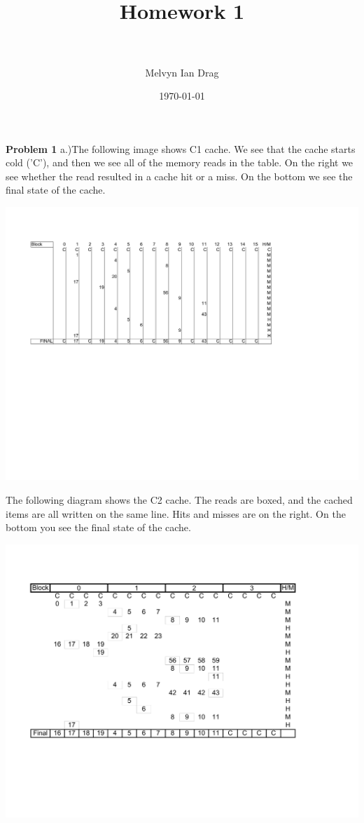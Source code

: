 \documentclass{article} %
\title{	
\normalfont \normalsize 
\horrule{0.5pt} \\[0.4cm] 
\huge Homework 1 \\ 
\horrule{2pt} \\[0.5cm] 
}
\author{Melvyn Ian Drag}
\date{\normalsize\today}
\begin{document}
\maketitle 
\textbf{Problem 1} a.)The following image shows C1 cache. We see that the cache starts cold ('C'), and then we see all of the memory reads in the table. On the right we see whether the read resulted in a cache hit or a miss. On the bottom we see the final state of the cache.
\begin{center}
\includegraphics[trim = 0in 3.5in 0inin 1in, scale=0.6]{1a.pdf}
\end{center}

The following diagram shows the C2 cache. The reads are boxed, and the cached items  are all written on the same line. Hits and misses are on the right. On the bottom you see the final state of the cache.
\begin{center}
\includegraphics[trim=0 2.5in 0 1in,scale=0.5]{1b.pdf}
\end{center}
\end{document}
